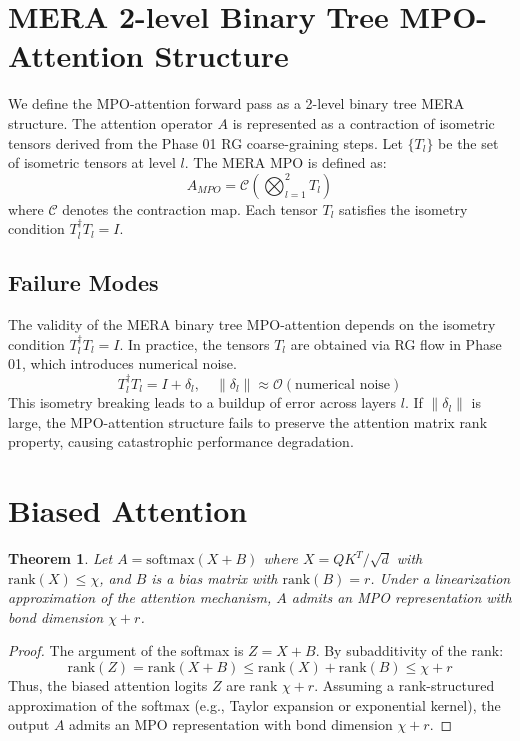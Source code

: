 \documentclass{article}
\newtheorem{theorem}{Theorem}
\begin{document}
\section{MERA 2-level Binary Tree MPO-Attention Structure}

We define the MPO-attention forward pass as a 2-level binary tree MERA structure. The attention operator $A$ is represented as a contraction of isometric tensors derived from the Phase 01 RG coarse-graining steps. Let $\{T_l\}$ be the set of isometric tensors at level $l$.
The MERA MPO is defined as:
\[ A_{MPO} = \mathcal{C}\left( \bigotimes_{l=1}^2 T_l \right) \]
where $\mathcal{C}$ denotes the contraction map. Each tensor $T_l$ satisfies the isometry condition $T_l^\dagger T_l = I$.

\subsection{Failure Modes}

The validity of the MERA binary tree MPO-attention depends on the isometry condition $T_l^\dagger T_l = I$. In practice, the tensors $T_l$ are obtained via RG flow in Phase 01, which introduces numerical noise.
\[ T_l^\dagger T_l = I + \delta_l, \quad \|\delta_l\| \approx \mathcal{O}(\text{numerical noise}) \]
This isometry breaking leads to a buildup of error across layers $l$. If $\|\delta_l\|$ is large, the MPO-attention structure fails to preserve the attention matrix rank property, causing catastrophic performance degradation.



\section{Biased Attention}

\begin{theorem}
Let $A = \text{softmax}(X + B)$ where $X = QK^T/\sqrt{d}$ with $\text{rank}(X) \le \chi$, and $B$ is a bias matrix with $\text{rank}(B) = r$.
Under a linearization approximation of the attention mechanism, $A$ admits an MPO representation with bond dimension $\chi + r$.
\end{theorem}

\begin{proof}
The argument of the softmax is $Z = X + B$.
By subadditivity of the rank:
\[ \text{rank}(Z) = \text{rank}(X + B) \le \text{rank}(X) + \text{rank}(B) \le \chi + r \]
Thus, the biased attention logits $Z$ are rank $\chi + r$. Assuming a rank-structured approximation of the softmax (e.g., Taylor expansion or exponential kernel), the output $A$ admits an MPO representation with bond dimension $\chi + r$.
\end{proof}
\end{document}
